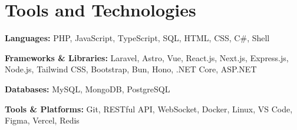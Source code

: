\section{Tools and Technologies}

\begin{onecolentry}
	\textbf{Languages:} PHP, JavaScript, TypeScript, SQL, HTML, CSS, C\#, Shell
\end{onecolentry}

\vspace{0.1cm}

\begin{onecolentry}
	\textbf{Frameworks \& Libraries:} Laravel, Astro, Vue, React.js, Next.js, Express.js, Node.js, Tailwind CSS, Bootstrap, Bun, Hono, .NET Core, ASP.NET
\end{onecolentry}

\vspace{0.1cm}

\begin{onecolentry}
	\textbf{Databases:} MySQL, MongoDB, PostgreSQL
\end{onecolentry}

\vspace{0.1cm}

\begin{onecolentry}
	\textbf{Tools \& Platforms:} Git, RESTful API, WebSocket, Docker, Linux, VS Code, Figma, Vercel, Redis
\end{onecolentry}
